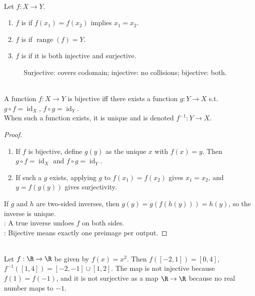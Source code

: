 \begin{definition} \label{def:injective-surjective-bijective} \\
Let $f:X\to Y$.
\begin{enumerate}[label=\roman*.]
\setlength{\itemsep}{0pt}
\item $f$ is  if $f(x_1)=f(x_2)$ implies $x_1=x_2$.
\item $f$ is  if $\operatorname{range}(f)=Y$.
\item $f$ is  if it is both injective and surjective.
\end{enumerate}
\end{definition}

\begin{figure}[H]
  \centering
  
  \caption{Surjective: covers codomain; injective: no collisions; bijective: both.}
  \label{fig:injective-surjective-bijective-maps}
\end{figure}

\begin{theorem} \label{thm:bijective-iff-invertible-function} \\
A function $f:X\to Y$ is bijective iff there exists a function $g:Y\to X$ s.t. $g\circ f=\operatorname{id}_X$, $f\circ g=\operatorname{id}_Y$.\\
When such a function exists, it is unique and is denoted $f^{-1}:Y\to X$.
\begin{proof}
\begin{enumerate}[label=\roman*.]
\setlength{\itemsep}{0pt}
\item[$(\Rightarrow)$] If $f$ is bijective, define $g(y)$ as the unique $x$ with $f(x)=y$. Then $g\circ f=\operatorname{id}_X$ and $f\circ g=\operatorname{id}_Y$.
\item[$(\Leftarrow)$] If such a $g$ exists, applying $g$ to $f(x_1)=f(x_2)$ gives $x_1=x_2$, and $y=f(g(y))$ gives surjectivity.
\end{enumerate}
If $g$ and $h$ are two-sided inverses, then $g(y)=g(f(h(y)))=h(y)$, so the inverse is unique.\\
: A true inverse undoes $f$ on both sides.\\
: Bijective means exactly one preimage per output.
\end{proof}
\end{theorem}

\begin{example} \label{ex:square-map-image-preimage} \\
Let $f:\R\to\R$ be given by $f(x)=x^2$. Then $f([-2,1])=[0,4]$, $f^{-1}([1,4])=[-2,-1]\cup[1,2]$. The map is not injective because $f(1)=f(-1)$, and it is not surjective as a map $\R\to\R$ because no real number maps to $-1$.
\end{example}
